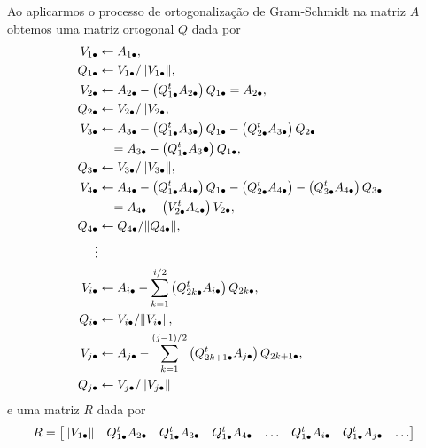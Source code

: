 \begin{questions}
\begin{solution}
        Ao aplicarmos o processo de ortogonaliza\c{c}\~{a}o de Gram-Schmidt na matriz $A$ obtemos uma matriz ortogonal $Q$ dada por
        \begin{align*}
            V_{1 \bullet} &\leftarrow A_{1 \bullet}, \\
            Q_{1 \bullet} &\leftarrow V_{1 \bullet} / \| V_{1 \bullet} \|, \\
            V_{2 \bullet} &\leftarrow A_{2 \bullet} - \left( Q_{1 \bullet}^t A_{2 \bullet} \right) Q_{1 \bullet} = A_{2 \bullet}, \\
            Q_{2 \bullet} &\leftarrow V_{2 \bullet} / \| V_{2 \bullet}, \\
            V_{3 \bullet} &\leftarrow A_{3 \bullet} - \left( Q_{1 \bullet}^t A_{3 \bullet} \right) Q_{1 \bullet} - \left( Q_{2 \bullet}^t A_{3 \bullet} \right) Q_{2 \bullet} \\
            &\quad = A_{3 \bullet} - \left( Q_{1 \bullet}^t A_{3} \bullet \right) Q_{1 \bullet}, \\
            Q_{3 \bullet} &\leftarrow V_{3 \bullet} / \| V_{3 \bullet} \|, \\
            V_{4 \bullet} &\leftarrow A_{4 \bullet} - \left( Q_{1 \bullet}^t A_{4 \bullet} \right) Q_{1 \bullet} - \left( Q_{2 \bullet}^t A_{4 \bullet} \right) - \left( Q_{3 \bullet}^t A_{4 \bullet} \right) Q_{3 \bullet} \\
            &\quad = A_{4 \bullet} - \left( V_{2 \bullet}^t A_{4 \bullet} \right) V_{2 \bullet}, \\
            Q_{4 \bullet} &\leftarrow Q_{4 \bullet} / \| Q_{4 \bullet} \|, \\
            \vdots \\
            V_{i \bullet} &\leftarrow A_{i \bullet} - \sum_{k = 1}^{i / 2} \left( Q_{2k \bullet}^t A_{i \bullet} \right) Q_{2k \bullet}, \\
            Q_{i \bullet} &\leftarrow V_{i \bullet} / \| V_{i \bullet} \|, \\
            V_{j \bullet} &\leftarrow A_{j \bullet} - \sum_{k = 1}^{(j - 1) / 2} \left( Q_{2k + 1 \bullet}^t A_{j \bullet} \right) Q_{2k + 1 \bullet}, \\
            Q_{j \bullet} &\leftarrow V_{j \bullet} / \| V_{j \bullet} \|
        \end{align*}
        e uma matriz $R$ dada por
        \begin{align*}
            R &= \begin{bmatrix}
                \| V_{1 \bullet} \| & Q_{1 \bullet}^t A_{2 \bullet} & Q_{1 \bullet}^t A_{3 \bullet} & Q_{1 \bullet}^t A_{4 \bullet} & \ldots & Q_{1 \bullet}^t A_{i \bullet} & Q_{1 \bullet}^t A_{j \bullet} & \ldots \\  

\end{bmatrix}
\end{align*}
\end{solution}
\end{questions}
